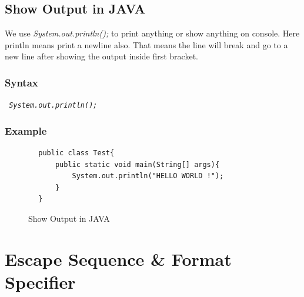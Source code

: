 \documentclass[openany]{book}  %
\begin{document}
% 
% 
\section{Show Output in JAVA}
We use \textit{System.out.println();} to print anything or show anything on console. Here println means print a newline also.
That means the line will break and go to a new line after showing the output inside first bracket.
% 
% 
\subsection{Syntax}
\begin{center}
    \tt{
        \textit{System.out.println();}
    }
\end{center}
% 
% 
\subsection{Example}
\begin{center}
    \begin{verbatim}
        public class Test{
            public static void main(String[] args){
                System.out.println("HELLO WORLD !");
            }
        }
    \end{verbatim}
\end{center}
% 
% 
\begin{figure}[htbp]
    \begin{center}
        \caption{Show Output in JAVA\cite{Ref3}}
    \end{center}
\end{figure}

% 
% 
\chapter{Escape Sequence \& Format Specifier}
% 
%
\end{document}
